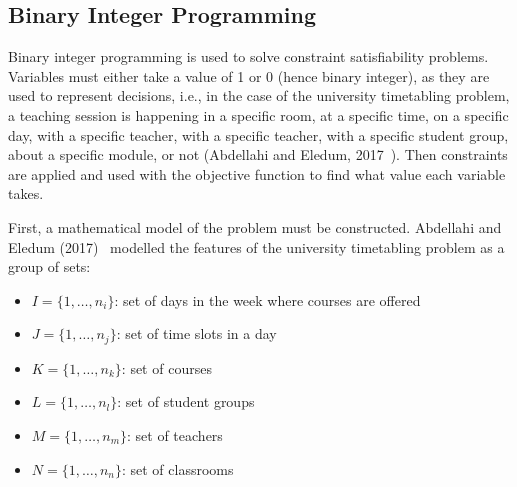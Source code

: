 \subsection{Binary Integer Programming}

Binary integer programming is used to solve constraint satisfiability problems.
Variables must either take a value of 1 or 0 (hence binary integer), as they 
are used to represent decisions, i.e., in the case of the university 
timetabling problem, a teaching session is happening in a specific room, at a 
specific time, on a specific day, with a specific teacher, with a specific 
teacher, with a specific student group, about a specific module, or 
not (Abdellahi and Eledum, 2017~\cite{bip_example}).
Then constraints are applied and used with the objective function to find what
value each variable takes.

First, a mathematical model of the problem must be constructed.
Abdellahi and Eledum (2017)~\cite{bip_example} modelled the features of the
university timetabling problem as a group of sets:
\begin{itemize}
	\item
		\begin{math}
			I = \{ 1, \dots , n_i \}
		\end{math}: set of days in the week where courses are offered
	\item
		\begin{math}
			J = \{ 1, \dots , n_j \}
		\end{math}: set of time slots in a day
	\item 
		\begin{math}
			K = \{ 1, \dots , n_k \}
		\end{math}: set of courses
	\item 
		\begin{math}
			L = \{ 1, \dots , n_l \}
		\end{math}: set of student groups
	\item 
		\begin{math}
			M = \{ 1, \dots , n_m \}
		\end{math}: set of teachers
	\item 
		\begin{math}
			N = \{ 1, \dots , n_n \}
		\end{math}: set of classrooms
\end{itemize}


